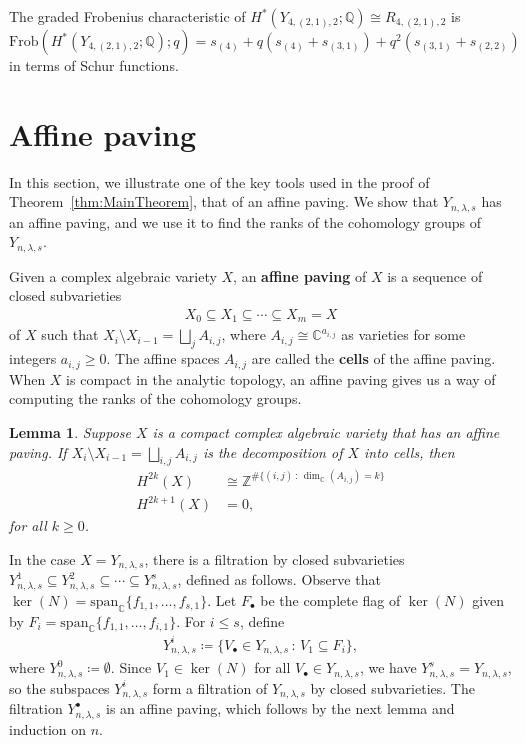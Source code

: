 \documentclass[submission]{FPSAC2021}
\theoremstyle{plain}
\newtheorem{lemma}[theorem]{Lemma}
\newenvironment{example}
 {\pushQED{\qed}\examplex}
  {\popQED\endexamplex}
\numberwithin{equation}{section}
\newcommand{\bC}{\mathbb{C}}
\newcommand{\bQ}{\mathbb{Q}}
\newcommand{\bZ}{\mathbb{Z}}
\newcommand{\st}{\,:\,}
\newcommand{\vspan}{\mathrm{span}}
\newcommand{\Frob}{\mathrm{Frob}}
\newcommand{\la}{\lambda}
\begin{document}
\begin{example}
The graded Frobenius characteristic of $H^*(Y_{4,(2,1),2};\bQ) \cong R_{4,(2,1),2}$ is
\begin{equation}
    \Frob(H^*(Y_{4,(2,1),2};\bQ);q) = s_{(4)} + q(s_{(4)}+s_{(3,1)}) + q^2(s_{(3,1)} + s_{(2,2)})
\end{equation}
in terms of Schur functions.
\end{example}


 
\section{Affine paving}\label{sec:AffinePaving}

In this section, we illustrate one of the key tools used in the proof of Theorem~\ref{thm:MainTheorem}, that of an affine paving. We show that $Y_{n,\lambda,s}$ has an affine paving, and we use it to find the ranks of the cohomology groups of $Y_{n,\lambda,s}$.
 
 Given a complex algebraic variety $X$, an {\bf affine paving} of $X$ is a sequence of closed subvarieties
\begin{align}
    X_0 \subseteq X_1\subseteq \cdots \subseteq X_m = X
\end{align}
of $X$ such that $X_i\setminus X_{i-1} = \bigsqcup_j A_{i,j}$, where $A_{i,j}\cong \bC^{a_{i,j}}$ as varieties for some integers $a_{i,j}\geq 0$. The affine spaces $A_{i,j}$ are called the {\bf cells} of the affine paving.
When $X$ is compact in the analytic topology, an affine paving gives us a way of computing the ranks of the cohomology groups.

\begin{lemma}\label{lem:OddCohVanishes}
Suppose $X$ is a compact complex algebraic variety that has an affine paving. If $X_i\setminus X_{i-1} = \bigsqcup_{i,j} A_{i,j}$ is the decomposition of $X$ into cells, then
\begin{align}
    H^{2k}(X) &\cong \bZ^{\#\{(i,j) \st \dim_\bC(A_{i,j}) = k\}}\\
    H^{2k+1}(X) & = 0,
\end{align}
for all $k\geq 0$.
\end{lemma}




In the case $X = Y_{n,\lambda,s}$, there is a filtration by closed subvarieties $Y^1_{n,\la,s}\subseteq Y^2_{n,\la,s}\subseteq\cdots \subseteq Y^s_{n,\la,s}$, defined as follows. Observe that $\ker(N) = \vspan_\bC\{f_{1,1},\dots, f_{s,1}\}$. Let $F_\bullet$ be the complete flag of $\ker(N)$ given by $F_i = \vspan_\bC\{ f_{1,1},\dots, f_{i,1}\}$.
For $i\leq s$, define
\begin{align}
Y_{n,\la,s}^i \coloneqq \{V_\bullet\in Y_{n,\la,s} \st V_1\subseteq F_i\},
\end{align}
where $Y_{n,\la,s}^0\coloneqq \emptyset$.
Since $V_1\in \ker(N)$ for all $V_\bullet \in Y_{n,\la,s}$, we have $Y^s_{n,\la,s} = Y_{n,\la,s}$, so the subspaces $Y_{n,\la,s}^i$ form a filtration of $Y_{n,\la,s}$ by closed subvarieties. The filtration $Y_{n,\lambda,s}^\bullet$ is an affine paving, which follows by the next lemma and induction on $n$.
\end{document}
